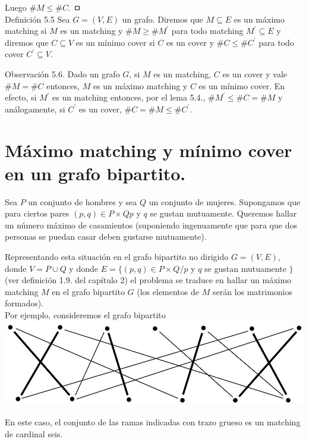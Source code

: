 \documentclass[10pt]{article}
\begin{document}
Luego $\# M \leq \# C$. ㅁ\\
Definición 5.5 Sea $G=(V, E)$ un grafo. Diremos que $M \subseteq E$ es un máximo matching si $M$ es un matching y $\# M \geq \# M^{\prime}$ para todo matching $M^{\prime} \subseteq E$ y diremos que $C \subseteq V$ es un mínimo cover si $C$ es un cover y $\# C \leq \# C^{\prime}$ para todo cover $C^{\prime} \subseteq V$.

Observación 5.6. Dado un grafo $G$, si $M$ es un matching, $C$ es un cover y vale $\# M=\# C$ entonces, $M$ es un máximo matching y $C$ es un mínimo cover. En efecto, si $M^{\prime}$ es un matching entonces, por el lema 5.4., $\# M^{\prime} \leq \# C=\# M$ y análogamente, si $C^{\prime}$ es un cover, $\# C=\# M \leq \# C^{\prime}$.

\section*{Máximo matching y mínimo cover en un grafo bipartito.}
Sea $P$ un conjunto de hombres y sea $Q$ un conjunto de mujeres. Supongamos que para ciertos pares $(p, q) \in P \times Q p$ y $q$ se gustan mutuamente. Queremos hallar un número máximo de casamientos (suponiendo ingenuamente que para que dos personas se puedan casar deben gustarse mutuamente).

Representando esta situación en el grafo bipartito no dirigido $G=(V, E)$, donde $V=P \cup Q$ y donde $E=\{(p, q) \in P \times Q / p$ y $q$ se gustan mutuamente $\}$ (ver definición 1.9. del capítulo 2) el problema se traduce en hallar un máximo matching $M$ en el grafo bipartito $G$ (los elementos de $M$ serán los matrimonios formados).\\
Por ejemplo, consideremos el grafo bipartito\\
\includegraphics[max width=\textwidth, center]{2025_09_05_aa5f7b8425e7dd302062g-15(1)}

En este caso, el conjunto de las ramas indicadas con trazo grueso es un matching de cardinal seis.
\end{document}
